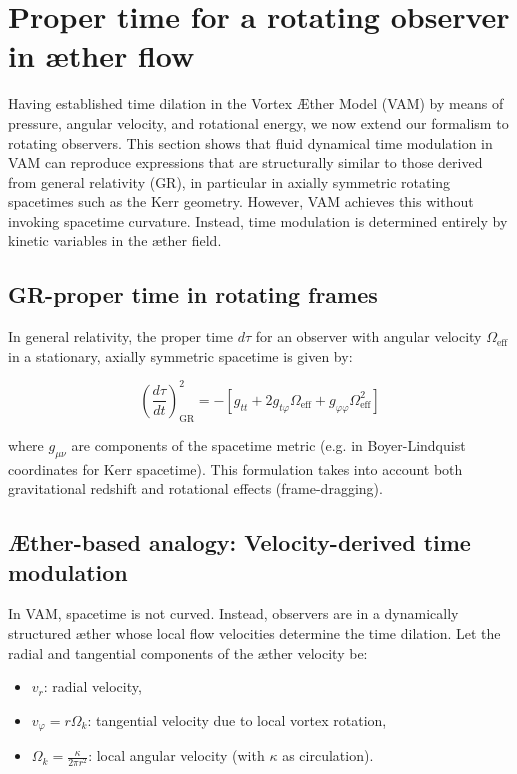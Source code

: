 \section{Proper time for a rotating observer in æther flow}

Having established time dilation in the Vortex Æther Model (VAM) by means of pressure, angular velocity, and rotational energy, we now extend our formalism to rotating observers. This section shows that fluid dynamical time modulation in VAM can reproduce expressions that are structurally similar to those derived from general relativity (GR), in particular in axially symmetric rotating spacetimes such as the Kerr geometry. However, VAM achieves this without invoking spacetime curvature. Instead, time modulation is determined entirely by kinetic variables in the æther field.

\subsection{GR-proper time in rotating frames}

In general relativity, the proper time \(d\tau\) for an observer with angular velocity \(\Omega_\text{eff}\) in a stationary, axially symmetric spacetime is given by:

\begin{equation}
 \left( \frac{d\tau}{dt} \right)^2_\text{GR} = -\left[ g_{tt} + 2g_{t\varphi} \Omega_\text{eff} + g_{\varphi\varphi} \Omega_\text{eff}^2 \right]
 \label{eq:GR_proper_time}
\end{equation}

where \(g_{\mu\nu}\) are components of the spacetime metric (e.g. in Boyer-Lindquist coordinates for Kerr spacetime). This formulation takes into account both gravitational redshift and rotational effects (frame-dragging).

\subsection{Æther-based analogy: Velocity-derived time modulation}

In VAM, spacetime is not curved. Instead, observers are in a dynamically structured æther whose local flow velocities determine the time dilation. Let the radial and tangential components of the æther velocity be:

\begin{itemize}
 \item \(v_r\): radial velocity,
 \item \(v_\varphi = r\Omega_k\): tangential velocity due to local vortex rotation,
 \item \(\Omega_k = \frac{\kappa}{2\pi r^2}\): local angular velocity (with \(\kappa\) as circulation).
\end{itemize}

